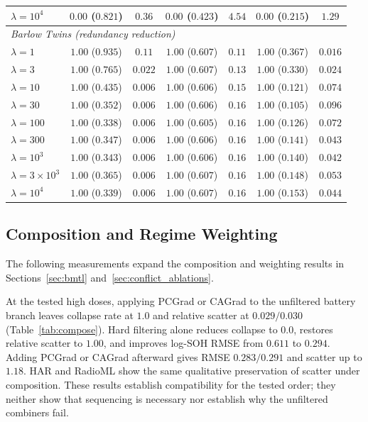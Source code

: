 \documentclass{article}
\begin{document}
\begin{table}[t]
{\begin{tabular}{lcccccc}
\quad $\lambda{=}10^4$ & $0.00$ ($0.821$) & $0.36$ & $0.00$ ($0.423$) & $4.54$ & $0.00$ ($0.215$) & $1.29$ \\
\midrule
\multicolumn{7}{l}{\textit{Barlow Twins (redundancy reduction)}} \\
\quad $\lambda{=}1$ & $1.00$ ($0.935$) & $0.11$ & $1.00$ ($0.607$) & $0.11$ & $1.00$ ($0.367$) & $0.016$ \\
\quad $\lambda{=}3$ & $1.00$ ($0.765$) & $0.022$ & $1.00$ ($0.607$) & $0.13$ & $1.00$ ($0.330$) & $0.024$ \\
\quad $\lambda{=}10$ & $1.00$ ($0.435$) & $0.006$ & $1.00$ ($0.606$) & $0.15$ & $1.00$ ($0.121$) & $0.074$ \\
\quad $\lambda{=}30$ & $1.00$ ($0.352$) & $0.006$ & $1.00$ ($0.606$) & $0.16$ & $1.00$ ($0.105$) & $0.096$ \\
\quad $\lambda{=}100$ & $1.00$ ($0.338$) & $0.006$ & $1.00$ ($0.605$) & $0.16$ & $1.00$ ($0.126$) & $0.072$ \\
\quad $\lambda{=}300$ & $1.00$ ($0.347$) & $0.006$ & $1.00$ ($0.606$) & $0.16$ & $1.00$ ($0.141$) & $0.043$ \\
\quad $\lambda{=}10^3$ & $1.00$ ($0.343$) & $0.006$ & $1.00$ ($0.606$) & $0.16$ & $1.00$ ($0.140$) & $0.042$ \\
\quad $\lambda{=}3\times10^3$ & $1.00$ ($0.365$) & $0.006$ & $1.00$ ($0.607$) & $0.16$ & $1.00$ ($0.148$) & $0.053$ \\
\quad $\lambda{=}10^4$ & $1.00$ ($0.339$) & $0.006$ & $1.00$ ($0.607$) & $0.16$ & $1.00$ ($0.153$) & $0.044$ \\
\bottomrule
\end{tabular}}
\end{table}

\subsection{Composition and Regime Weighting}

The following measurements expand the composition and weighting results in Sections~\ref{sec:bmtl} and~\ref{sec:conflict_ablations}.

At the tested high doses, applying PCGrad or CAGrad to the unfiltered battery branch leaves collapse rate at $1.0$ and relative scatter at $0.029/0.030$ (Table~\ref{tab:compose}). Hard filtering alone reduces collapse to $0.0$, restores relative scatter to $1.00$, and improves log-SOH RMSE from $0.611$ to $0.294$. Adding PCGrad or CAGrad afterward gives RMSE $0.283/0.291$ and scatter up to $1.18$. HAR and RadioML show the same qualitative preservation of scatter under composition. These results establish compatibility for the tested order; they neither show that sequencing is necessary nor establish why the unfiltered combiners fail.
\end{document}
